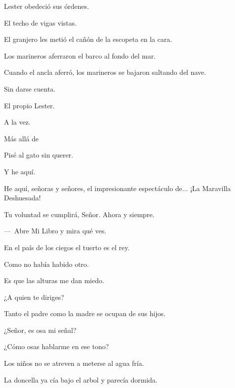 \sk
Lester obedeció sus órdenes.

\sk
El techo de vigas vistas.

\sk
El granjero les metió el cañón de la escopeta en la cara. 

\sk
Los marineros aferraron el barco al fondo del mar. 

\sk
Cuando el ancla aferró, los marineros se bajaron saltando del nave. 

\sk
Sin darse cuenta. 

\sk
El propio Lester. 

\sk
A la vez. 

\sk
Más allá de 

\sk
Pisé al gato sin querer. 

\sk
Y he aquí. 

\sk
He aquí, señoras y señores, el impresionante espectáculo de... ¡La Maravilla Deshuesada! 

\sk
Tu voluntad se cumplirá, Señor. Ahora y siempre.

\sk
---~Abre Mi Libro y mira qué ves. 

\sk
En el país de los ciegos el tuerto es el rey.

\sk
Como no había habido otro. 

\sk
Es que las alturas me dan miedo. 

\sk
¿A quien te diriges? 

\sk
Tanto el padre como la madre se ocupan de sus hijos. 

\sk
¿Señor, es osa mi señal? \nb{}

\sk
¿Cómo osas hablarme en ese tono? 

\sk
Los niños no se atreven a meterse al agua fría. 

\sk
La doncella ya cía bajo el arbol y parecía dormida. 

